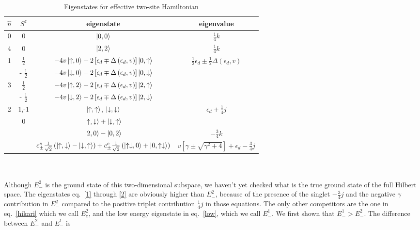 \documentclass[twoside]{report}
\numberwithin{equation}{section}
\begin{document}
\begin{table}[htpb!]
	\centering
	\begin{tabular}{|c|c|c|c|}
		\hline
		\(\hat n\) & \(S^z\) & eigenstate & eigenvalue\\
		\hline
		0 & 0 & \(\ket{0,0}\) & \(\frac{1}{4}k\)\\
		4 & 0 & \(\ket{2,2}\) & \(\frac{1}{4}k\)\\
		\multirow{2}{*}{1} & \(\frac{1}{2}\) & \(-4v\ket{\uparrow,0} +2 \left[ \epsilon_d \mp \Delta\left(\epsilon_d , v\right)\right] \ket{0, \uparrow}\) & \multirow{4}{*}{\(\frac{1}{2} \epsilon_d \pm \frac{1}{2}\Delta\left(\epsilon_d , v\right)\)}\\
		 & - \(\frac{1}{2}\) & \(-4v\ket{\downarrow,0} +2 \left[ \epsilon_d \mp \Delta\left(\epsilon_d , v\right)\right] \ket{0, \downarrow}\)  &\\
		\multirow{2}{*}{3} & \(\frac{1}{2}\) & \(-4v\ket{\uparrow,2} +2 \left[ \epsilon_d \mp \Delta\left(\epsilon_d , v\right)\right] \ket{2, \uparrow}\) &\\
		 & - \(\frac{1}{2}\) & \(-4v\ket{\downarrow,2} +2 \left[ \epsilon_d \mp \Delta\left(\epsilon_d , v\right)\right] \ket{2, \downarrow}\)  &\\
		\multirow{5}{*}{2} & 1,-1 & \(\ket{\uparrow,\uparrow}\), \(\ket{\downarrow,\downarrow}\) & \multirow{2}{*}{\(\epsilon_d + \frac{1}{4}j\)}\\
		& \multirow{3}{*}{0} & \(\ket{\uparrow,\downarrow} + \ket{\downarrow, \uparrow}\) & \\
		& & \(\ket{2,0} - \ket{0,2}\) & \(-\frac{3}{4}k\)\\
		& & \(c_\pm^s \frac{1}{\sqrt 2}\left(\ket{\uparrow, \downarrow} - \ket{\downarrow, \uparrow}\right) + c^c_\pm \frac{1}{\sqrt 2}\left(\ket{\uparrow\downarrow, 0} + \ket{0, \uparrow\downarrow}\right)\) & \(v\left[ \gamma \pm \sqrt{\gamma^2 + 4} \right] + \epsilon_d - \frac{3}{4}j\)\\
		\hline
	\end{tabular}
	\caption{Eigenstates for effective two-site Hamiltonian}
	\label{tab:label}
\end{table}
\\\\Although \(E^2_-\) is the ground state of this two-dimensional subspace, we haven't yet checked what is the true ground state of the full Hilbert space. The eigenstates eq.~\ref{1} through \ref{2} are obviously higher than \(E_-^2\), because of the presence of the singlet \(- \frac{3}{4}j\) and the negative \(\gamma\) contribution in \(E_-^2\) compared to the positive triplet contribution \( \frac{1}{4}j\) in those equations. The only other competitors are the one in eq.~\ref{hikari} which we call \(E_c^2\), and the low energy eigenstate in eq.~\ref{low}, which we call \(E_-^1\). We first shown that \(E_-^1 > E_-^2\). The difference between \(E_-^2\) and \(E_-^1\) is
\end{document}
